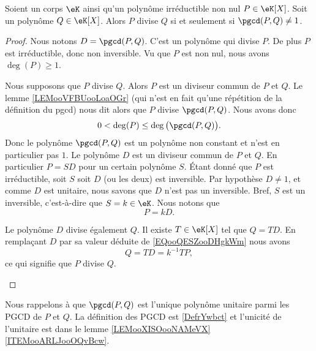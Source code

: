 \begin{lemma}       \label{LEMooVWBPooQITlUL}
	Soient un corps \( \eK\) ainsi qu'un polynôme irréductible non nul \( P\in \eK[X]\). Soit un polynôme \( Q\in \eK[X]\). Alors \( P\) divise \( Q\) si et seulement si \( \pgcd(P,Q)\neq 1\).
\end{lemma}

\begin{proof}
	Nous notons \( D=\pgcd(P,Q)\). C'est un polynôme qui divise \( P\). De plus \( P\) est irréductible, donc non inversible. Vu que \( P\) est non nul, nous avons \( \deg(P)\geq 1\).
	\begin{subproof}
		\spitem[$ \Rightarrow$]
		Nous supposons que \( P\) divise \( Q\). Alors \( P\) est un diviseur commun de \( P\) et \( Q\). Le lemme \ref{LEMooVFBUooLoaOGr} (qui n'est en fait qu'une répétition de la définition du pgcd) nous dit alors que \( P\) divise \( \pgcd(P,Q)\). Nous avons donc
		\begin{equation}
			0<\deg(P)\leq \deg\big( \pgcd(P,Q) \big).
		\end{equation}
		Donc le polynôme \( \pgcd(P,Q)\) est un polynôme non constant et n'est en particulier pas \( 1\).
		\spitem[$ \Leftarrow$]
		Le polynôme \( D\) est un diviseur commun de \( P\) et \( Q\). En particulier \( P=SD\) pour un certain polynôme \( S\). Étant donné que \( P\) est irréductible, soit \( S\) soit \( D\) (ou les deux) est inversible. Par hypothèse \( D\neq 1\), et comme \( D\) est unitaire, nous savons que \( D\) n'est pas un inversible. Bref, \( S\) est un inversible, c'est-à-dire que \( S=k\in \eK\). Nous notons que
		\begin{equation}        \label{EQooQESZooDHgkWm}
			P=kD.
		\end{equation}

		Le polynôme \( D\) divise également \( Q\). Il existe \( T\in \eK[X]\) tel que \( Q=TD\). En remplaçant \( D\) par sa valeur déduite de \eqref{EQooQESZooDHgkWm} nous avons
		\begin{equation}
			Q=TD=k^{-1} TP,
		\end{equation}
		ce qui signifie que \( P\) divise \( Q\).
	\end{subproof}
\end{proof}

Nous rappelons à  que \( \pgcd(P,Q)\) est l'unique polynôme unitaire parmi les PGCD de \( P\) et \( Q\). La définition des PGCD est \ref{DefrYwbct} et l'unicité de l'unitaire est dans le lemme \ref{LEMooXISOooNAMeVX}\ref{ITEMooARLJooOQvBcw}.

